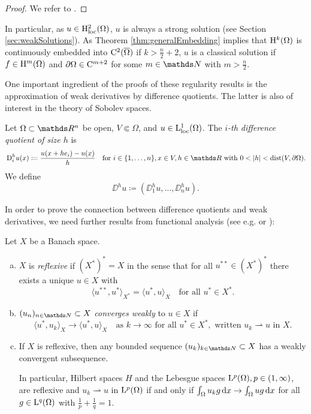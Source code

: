 \begin{proof}
  We refer to \cite[Theorems 1-6 in Section 6.3 and Theorem 6 in Section 6.2]{evans2010partial}.
\end{proof}

In particular, as $u \in \mathrm{H}_{\operatorname{loc}}^2(\Omega)$, $u$ is always a strong solution (see Section \ref{sec:weakSolutions}).
As Theorem \ref{thm:generalEmbedding} implies that $\mathrm{H}^k(\Omega)$ is continuously embedded into $\mathrm{C}^2(\overline\Omega)$ if $k > \frac{n}{2} + 2$, $u$ is a classical solution if $f \in \mathrm{H}^m(\Omega)$ and $\partial\Omega \in \mathrm{C}^{m + 2}$ for some $m \in \N$ with $m > \frac{n}{2}$.

One important ingredient of the proofs of these regularity results is the approximation of weak derivatives by difference quotients.
The latter is also of interest in the theory of Sobolev spaces.

\begin{defn}
  Let $\Omega \subset \R^n$ be open, $V \Subset \Omega$, and $u \in \mathrm{L}^1_{\operatorname{loc}}(\Omega)$.
  The \emph{$i$-th difference quotient of size $h$} is
  $$
  \DD_i^h u(x) \coloneqq \frac{u(x + he_i) - u(x)}{h} \quad\text{for } i \in \{1, \dots,n\}, x \in V, h \in \R \text{ with } 0 < |h| < \dist(V, \partial \Omega).
  $$
  We define
  $$
  \DD^h u\coloneqq ( \DD_1^h u, \dots,\DD_n^h u).
  $$
\end{defn}

In order to prove the connection between difference quotients and weak derivatives, we need further results from functional analysis (see e.g. \cite{dobrowolski2010angewandte} or \cite{alt2012lineare}):

\begin{prop}
  \label{prop:banachAlaoglu}
  Let $X$ be a Banach space.
  \begin{enumerate}[a)]
    \item $X$ is \emph{reflexive} if $(X^*)^* = X$ in the sense that for all $u^{**} \in (X^*)^*$ there exists a unique $u \in X$ with
      $$
      \langle u^{**}, u^* \rangle_{X^*} = \langle u^*, u \rangle_X \quad\text{for all } u^* \in X^*.
      $$
    \item $(u_n)_{n \in \N} \subset X$ \emph{converges weakly} to $u \in X$ if 
      $$
      \langle u^*, u_k \rangle_X \to \langle u^*, u \rangle_X \quad\text{as } k\to \infty \text{ for all } u^* \in X^*, \text{ written } u_k \rightharpoonup u \text{ in } X.
      $$
    \item If $X$ is reflexive, then any bounded sequence $(u_k)_{k \in \N} \subset X$ has a weakly convergent subsequence.

      In particular, Hilbert spaces $H$ and the Lebesgue spaces $\mathrm{L}^p(\Omega), p \in (1,\infty)$, are reflexive and $u_k \rightharpoonup u$ in $\mathrm{L}^p(\Omega)$ if and only if $\int_\Omega u_k g \, {\operatorname{d}\!{x}} \to \int_\Omega u g \, {\operatorname{d}\!{x}}$ for all $g \in \mathrm{L}^q(\Omega)$ with $\frac{1}{p} + \frac{1}{q} = 1$.
  \end{enumerate}
\end{prop}

